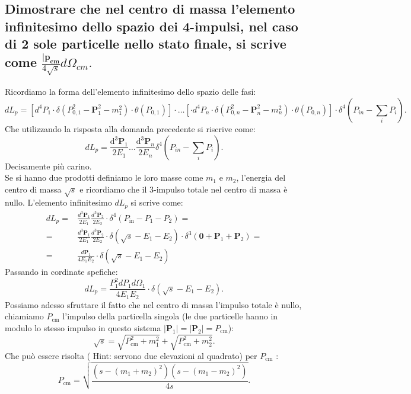 \subsection[]{Dimostrare che nel centro di massa l’elemento infinitesimo dello spazio dei 4-impulsi, nel caso di 2 sole particelle nello stato finale, si scrive come $\frac{|\boldsymbol{p_{cm}}}{4\sqrt{s}} d\Omega_{cm}.$}
Ricordiamo la forma dell'elemento infinitesimo dello spazio delle fasi:
\[
	dL_p = \left[ d^4P_1 \cdot \delta\left( P_{0,1}^2 - \boldsymbol{P}_1^2 - m_1^2 \right) \cdot \theta\left( P_{0,1} \right) \right] \cdot \ldots 
	\left[ \cdot d^4P_n \cdot \delta\left( P_{0,n}^2 - \boldsymbol{P}_n^2 - m_n^2 \right) \cdot \theta\left( P_{0,n} \right) \right] \cdot 
	\delta^4\left(  P_{in}-\sum_{i}P_i  \right) 
.\]
Che utilizzando la risposta alla domanda precedente si riscrive come:
\[
dL_p = \frac{\mbox{d}^3 \boldsymbol{P}_1}{2E_1} \ldots \frac{\mbox{d}^3 \boldsymbol{P}_n}{2E_n} \delta^4\left( P_{in}-\sum_{i}P_i \right) 
.\] 
Decisamente più carino.\\
Se si hanno due prodotti definiamo le loro masse come $m_1$ e  $m_2$, l'energia del centro di massa $\sqrt{s}$ e ricordiamo che il 3-impulso totale nel centro di massa è nullo. L'elemento infinitesimo $dL_p$ si scrive come:
\begin{align*}
	dL_p =& \frac{d^3 \boldsymbol{P}_1}{2E_1} \frac{d^3 \boldsymbol{P}_2}{2E_2} \cdot \delta^4\left(P_{\text{in}} - P_1 - P_2 \right) = \\ 
	= & \frac{d^3 \boldsymbol{P}_1}{2E_1} \frac{d^3 \boldsymbol{P}_2}{2E_2} \cdot \delta\left( \sqrt{s}-E_1-E_2\right) \cdot 
	\delta^3\left( \boldsymbol{0} + \boldsymbol{P}_1 + \boldsymbol{P}_2 \right) = \\
	= & \frac{ d \boldsymbol{P}_1 }{4E_1E_2} \cdot \delta\left( \sqrt{s}-E_1-E_2\right)   
\end{align*}
Passando in cordinate spefiche:
\[
	dL_p = \frac{P_1^2 dP_1 d \Omega_1 }{4E_1E_2} \cdot \delta\left( \sqrt{s} -E_1-E_2  \right) 
.\]
Possiamo adesso sfruttare il fatto che nel centro di massa l'impulso totale è nullo, chiamiamo $P_{\text{cm}}$ l'impulso della particella singola (le due particelle hanno in modulo lo stesso impulso in questo sistema $\left| \boldsymbol{P}_1 \right| = \left| \boldsymbol{P}_2 \right| = P_{\text{cm}}$):
\[
	\sqrt{s}= \sqrt{P_{\text{cm}}^2 + m_1^2} + \sqrt{ P_{\text{cm}}^2 + m_2^2} 
.\] 
Che può essere risolta ( Hint: servono due elevazioni al quadrato) per $P_{\text{cm}}$ :
\[
	P_{\text{cm}} = \sqrt{\frac{\left( s - \left( m_1+m_2 \right)^2 \right) \left( s - \left( m_1 - m_2 \right)^2 \right)}{4s}} 
.\]
